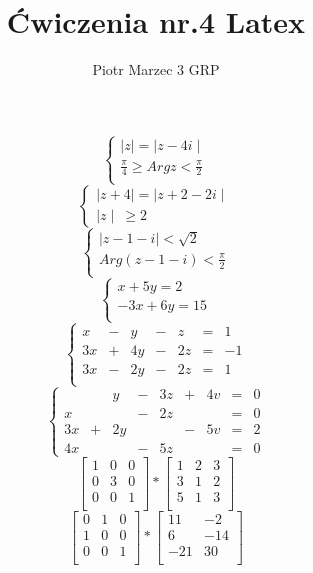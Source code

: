 \documentclass[a4paper]{article}
\author{Piotr Marzec 3 GRP}
\title{Ćwiczenia nr.4 Latex}
\begin{document}
$$
\begin{cases}
	\mid z \mid = \mid z-4i\mid \\
	\frac{\pi}{4}\geq Arg z < \frac{\pi}{2} \\
\end{cases}
$$
$$
	\begin{cases}
	\mid z+4 \mid = \mid z+2-2i \mid \\
	\mid z \mid\ \geq 2
	\end{cases}
$$
$$
\begin{cases}
\mid z - 1 - i \mid < \sqrt{2} \\
Arg(z-1-i)<\frac{\pi}{2} \\
\end{cases}
$$
$$
\begin{cases}
x+5y=2\\
-3x+6y=15\\
\end{cases}
$$
$$
\left\{
\begin{array}{rrrrrrr}
x&-&y&-&z&=&1\\
3x&+&4y&-&2z&=&-1\\
3x&-&2y&-&2z&=&1\\
\end{array}
\right.
$$
$$
\left\{
\begin{array}{rrrrrrrrr}
&&y&-&3z&+&4v&=&0\\
x&&&-&2z&&&=&0\\
3x&+&2y&&&-&5v&=&2\\
4x&&&-&5z&&&=&0
\end{array}
\right.
$$
$$
\begin{bmatrix}
1&0&0\\
0&3&0\\
0&0&1\\
\end{bmatrix} * \begin{bmatrix}
				1&2&3\\
				3&1&2\\
				5&1&3\\
				\end{bmatrix}
$$
$$
\begin{bmatrix}
0&1&0\\
1&0&0\\
0&0&1\\
\end{bmatrix} * \begin{bmatrix}
				11&-2\\
				6&-14\\
				-21&30\\
				\end{bmatrix}
$$
\end{document}
